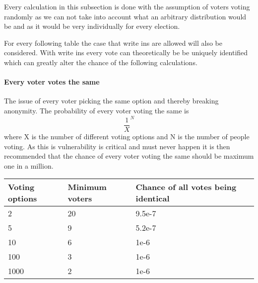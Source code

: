 Every calculation in this subsection is done with the assumption of voters voting randomly as we can not take into account what an arbitrary distribution would be and as it would be very individually for every election. %

For every following table the case that write ins are allowed will also be considered. With write ins every vote can theoretically be be uniquely identified which can greatly alter the chance of the following calculations.



\paragraph{Every voter votes the same} The issue of every voter picking the same option and thereby breaking anonymity. The probability of every voter voting the same is \[ \frac{1}{X}^N \] where X is the number of different voting options and N is the number of people voting. As this is vulnerability is critical and must never happen it is then recommended that the chance of every voter voting the same should be maximum one in a million.
\begin{table}[H]
\begin{tabular}{|l|l|l|}
\hline
Voting options & Minimum voters & Chance of all votes being identical \\ \hline
2                   & 20     &      9.5e-7                               \\ \hline
5                   & 9     &       5.2e-7                              \\ \hline
10                  & 6      &        1e-6                           \\ \hline
100                 & 3      &        1e-6                         \\ \hline
1000                & 2      &        1e-6                   \\ \hline
\end{tabular}
\end{table}

